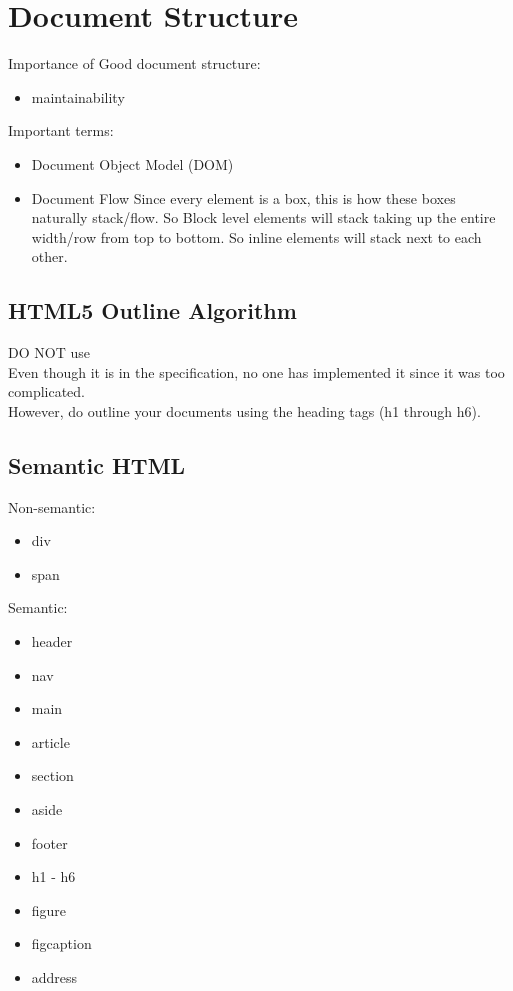\documentclass[]{article}
\newcommand{\<}{\guilsinglleft}
\renewcommand{\>}{\guilsinglright}
\begin{document}
\section{Document Structure}
Importance of Good document structure:
\begin{itemize}
	\item maintainability
\end{itemize}
Important terms:
\begin{itemize}
	\item Document Object Model (DOM)
	
	\item Document Flow
	\subitem Since every element is a box, this is how these boxes naturally stack/flow.
	\subitem So Block level elements will stack taking up the entire width/row from top to bottom.
	\subitem So inline elements will stack next to each other.
\end{itemize}

\subsection{HTML5 Outline Algorithm}
DO NOT use
\\
Even though it is in the specification, no one has implemented it since it was too complicated.
\\
However, do outline your documents using the heading tags (h1 through h6).

\subsection{Semantic HTML}
Non-semantic:
\begin{itemize}
	\item div
	\item span
\end{itemize}
Semantic:
\begin{itemize}
	\item header
	\item nav
	\item main
	\item article
	\item section
	\item aside
	\item footer
	\item h1 - h6
	\item figure
	\item figcaption
	\item address
\end{itemize}
\end{document}
